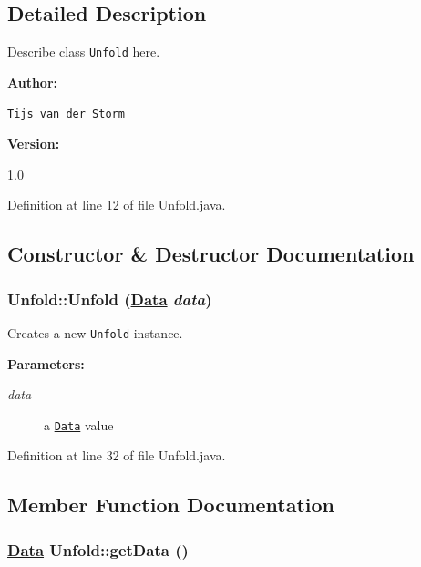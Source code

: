 \subsection{Detailed Description}
Describe class {\tt Unfold} here.

\begin{Desc}
\item[{\bf Author: }]\par
\href{mailto:tvdstorm@wins.uva.nl}{\tt Tijs van der Storm} \end{Desc}
\begin{Desc}
\item[{\bf Version: }]\par
1.0 \end{Desc}




Definition at line 12 of file Unfold.java.

\subsection{Constructor \& Destructor Documentation}
\hypertarget{classUnfold_a0}{
\subsubsection[Unfold]{\setlength{\rightskip}{0pt plus 5cm}Unfold::Unfold (\hyperlink{interfaceData}{Data} {\em data})}}
\label{classUnfold_a0}


Creates a new {\tt Unfold} instance.

\begin{Desc}
\item[{\bf Parameters: }]\par
\begin{description}
\item[
{\em data}]a {\tt \hyperlink{interfaceData}{Data}} value \end{description}
\end{Desc}


Definition at line 32 of file Unfold.java.

\subsection{Member Function Documentation}
\hypertarget{classUnfold_a1}{
\subsubsection[getData]{\setlength{\rightskip}{0pt plus 5cm}\hyperlink{interfaceData}{Data} Unfold::get\-Data ()}}
\label{classUnfold_a1}


